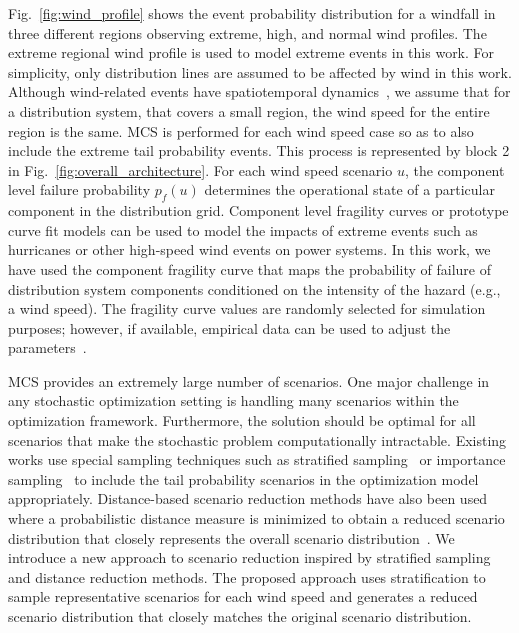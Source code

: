 Fig.~\ref{fig:wind_profile} shows the event probability distribution for a windfall in three different regions observing extreme, high, and normal wind profiles. The extreme regional wind profile is used to model extreme events in this work. For simplicity, only distribution lines are assumed to be affected by wind in this work. Although wind-related events have spatiotemporal dynamics~\cite{poudyal2021spatiotemporal}, we assume that for a distribution system, that covers a small region, the wind speed for the entire region is the same. MCS is performed for each wind speed case so as to also include the extreme tail probability events. This process is represented by block 2 in Fig.~\ref{fig:overall_architecture}. For each wind speed scenario $u$, the component level failure probability $p_f(u)$ determines the operational state of a particular component in the distribution grid. Component level fragility curves \cite{panteli2017power} or prototype curve fit models \cite{powell1995real} can be  used to model the impacts of extreme events such as hurricanes or other high-speed wind events on power systems. In this work, we have used the component fragility curve that maps the probability of failure of distribution system components conditioned on the intensity of the hazard (e.g., a wind speed). The fragility curve values are randomly selected for simulation purposes; however, if available, empirical data can be used to adjust the parameters~\cite{7036086}.

MCS provides an extremely large number of scenarios. One major challenge in any stochastic optimization setting is handling many scenarios within the optimization framework. Furthermore, the solution should be optimal for all scenarios that make the stochastic problem computationally intractable. Existing works use special sampling techniques such as stratified sampling~\cite{parsons2014stratified} or importance sampling~\cite{ekblom2020importance} to include the tail probability scenarios in the optimization model appropriately. Distance-based scenario reduction methods have also been used where a probabilistic distance measure is minimized to obtain a reduced scenario distribution that closely represents the overall scenario distribution~\cite{heitsch2007note}. We introduce a new approach to scenario reduction inspired by stratified sampling and distance reduction methods. The proposed approach uses stratification to sample representative scenarios for each wind speed and generates a reduced scenario distribution that closely matches the original scenario distribution.

